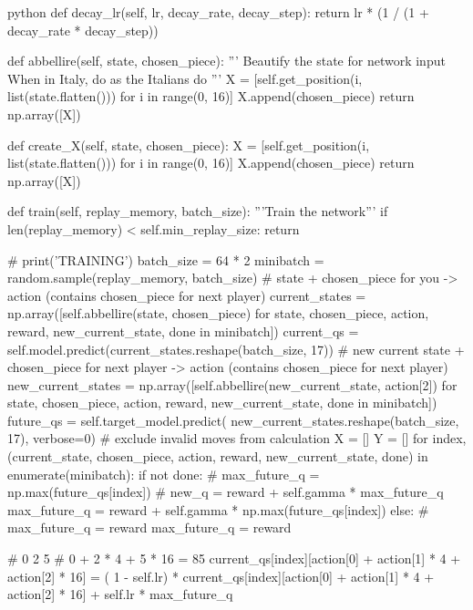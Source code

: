 \begin{mintedbox}{python}
    def decay_lr(self, lr, decay_rate, decay_step):
        return lr * (1 / (1 + decay_rate * decay_step))

    def abbellire(self, state, chosen_piece):
        '''
        Beautify the state for network input
        When in Italy, do as the Italians do
        '''
        X = [self.get_position(i, list(state.flatten())) for i in range(0, 16)]
        X.append(chosen_piece)
        return np.array([X])

    def create_X(self, state, chosen_piece):
        X = [self.get_position(i, list(state.flatten())) for i in range(0, 16)]
        X.append(chosen_piece)
        return np.array([X])

    def train(self, replay_memory, batch_size):
        '''Train the network'''
        if len(replay_memory) < self.min_replay_size:
            return

        # print('TRAINING')
        batch_size = 64 * 2
        minibatch = random.sample(replay_memory, batch_size)
        # state + chosen_piece for you -> action (contains chosen_piece for next player)
        current_states = np.array([self.abbellire(state, chosen_piece)
                                    for state, chosen_piece, action, reward, new_current_state, done in minibatch])
        current_qs = self.model.predict(current_states.reshape(batch_size, 17))
        # new current state + chosen_piece for next player -> action (contains chosen_piece for next player)
        new_current_states = np.array([self.abbellire(new_current_state, action[2])
                                        for state, chosen_piece, action, reward, new_current_state, done in minibatch])
        future_qs = self.target_model.predict(
            new_current_states.reshape(batch_size, 17), verbose=0)
        # exclude invalid moves from calculation
        X = []
        Y = []
        for index, (current_state, chosen_piece, action, reward, new_current_state, done) in enumerate(minibatch):
            if not done:
                # max_future_q = np.max(future_qs[index])
                # new_q = reward + self.gamma * max_future_q
                max_future_q = reward + self.gamma * np.max(future_qs[index])
            else:
                # max_future_q = reward
                max_future_q = reward

            # 0 2 5
            # 0 + 2 * 4 + 5 * 16 = 85
            current_qs[index][action[0] + action[1] * 4 + action[2] * 16] = (
                1 - self.lr) * current_qs[index][action[0] + action[1] * 4 + action[2] * 16] + self.lr * max_future_q


\end{mintedbox}
